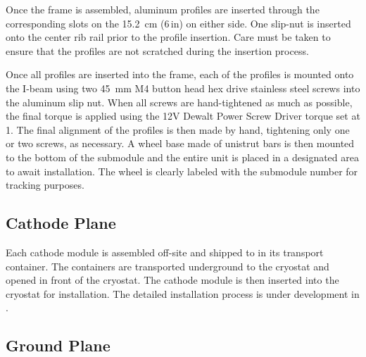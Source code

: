 Once the frame is assembled, aluminum profiles are inserted through the corresponding slots on the \SI{15.2}{\cm} (\num{6}\,in) on either side.  One slip-nut 
is inserted onto the center rib rail prior to the profile insertion.  
Care must be taken to ensure that the profiles are not scratched during the insertion process. 

Once all profiles are inserted into the frame, each of the profiles is mounted onto the I-beam using two \SI{45}{\mm} M4 button head hex drive stainless steel screws into the aluminum slip nut. 
When all screws are hand-tightened as much as possible, the final torque is applied using the 12V Dewalt Power Screw Driver torque set at 1.  The final alignment of the profiles is then made by hand, tightening only one or two screws, as necessary.
A wheel base made of unistrut bars is then mounted to the bottom of the submodule and the entire unit is placed in a designated area to await installation.   The wheel is clearly labeled with the submodule number for tracking purposes.


\subsection{Cathode Plane}
\label{sec:fddp-hv-prod-assy-cathode}



Each cathode module is assembled off-site and shipped to \surf in its transport container.   The containers are transported underground to the cryostat and opened in front of the cryostat.  The cathode module is then inserted into the cryostat for installation.  The detailed installation process is under development in .

\subsection{Ground Plane} %
\label{sec:fddp-prod-assy-ground-grid}


